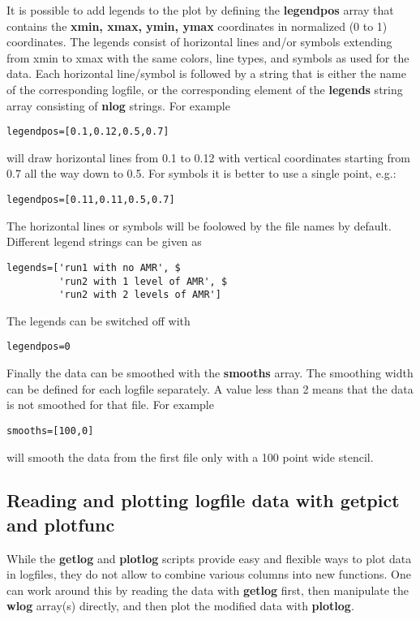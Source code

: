 It is possible to add legends to the plot by defining the {\bf legendpos}
array that contains the {\bf xmin, xmax, ymin, ymax} coordinates 
in normalized (0 to 1) coordinates. The legends consist of 
horizontal lines and/or symbols extending from xmin to xmax with the 
same colors, line types, and symbols as used for the data. 
Each horizontal line/symbol is followed by a string that is either
the name of the corresponding logfile, or the corresponding
element of the {\bf legends} string array consisting of {\bf nlog} strings.
For example
\begin{verbatim}
legendpos=[0.1,0.12,0.5,0.7]
\end{verbatim}
will draw horizontal lines from 0.1 to 0.12 with vertical coordinates
starting from 0.7 all the way down to 0.5. For symbols it is better
to use a single point, e.g.:
\begin{verbatim}
legendpos=[0.11,0.11,0.5,0.7]
\end{verbatim}
The horizontal lines or symbols will be foolowed by the file names by default.
Different legend strings can be given as
\begin{verbatim}
legends=['run1 with no AMR', $
         'run2 with 1 level of AMR', $
         'run2 with 2 levels of AMR']
\end{verbatim}
The legends can be switched off with 
\begin{verbatim}
legendpos=0
\end{verbatim}
Finally the data can be smoothed with the {\bf smooths} array. 
The smoothing width can be defined for each logfile separately. 
A value less than 2 means that the data is not smoothed for that file.
For example
\begin{verbatim}
smooths=[100,0]
\end{verbatim}
will smooth the data from the first file only with a 100 point wide stencil.

\subsection{Reading and plotting logfile data with getpict and plotfunc}

While the {\bf getlog} and {\bf plotlog} scripts provide easy and flexible
ways to plot data in logfiles, they do not allow to combine various columns
into new functions. One can work around this by reading the data
with {\bf getlog} first, then manipulate the {\bf wlog} array(s) 
directly, and then plot the modified data with {\bf plotlog}. 


